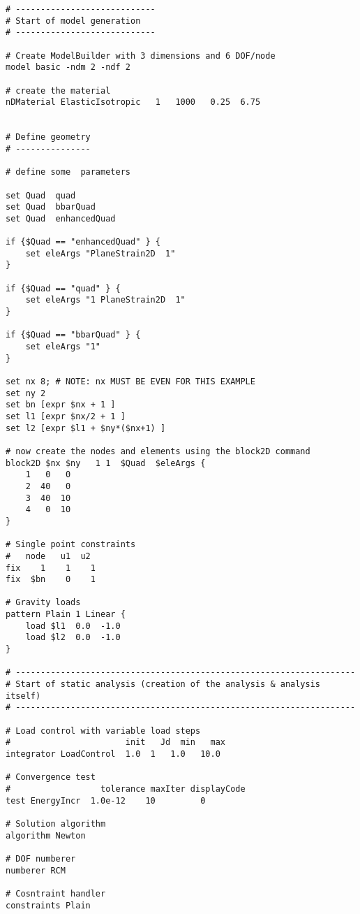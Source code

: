 \documentclass[12pt]{article}
\begin{document}
\vspace{0.2in} 
{\sf\small
\begin{verbatim}
# ----------------------------
# Start of model generation
# ----------------------------

# Create ModelBuilder with 3 dimensions and 6 DOF/node
model basic -ndm 2 -ndf 2

# create the material
nDMaterial ElasticIsotropic   1   1000   0.25  6.75 


# Define geometry
# ---------------

# define some  parameters

set Quad  quad
set Quad  bbarQuad
set Quad  enhancedQuad

if {$Quad == "enhancedQuad" } {
    set eleArgs "PlaneStrain2D  1"
} 

if {$Quad == "quad" } {
    set eleArgs "1 PlaneStrain2D  1"
} 

if {$Quad == "bbarQuad" } {
    set eleArgs "1"
}

set nx 8; # NOTE: nx MUST BE EVEN FOR THIS EXAMPLE
set ny 2
set bn [expr $nx + 1 ] 
set l1 [expr $nx/2 + 1 ] 
set l2 [expr $l1 + $ny*($nx+1) ]

# now create the nodes and elements using the block2D command
block2D $nx $ny   1 1  $Quad  $eleArgs {
    1   0   0
    2  40   0
    3  40  10
    4   0  10
}

# Single point constraints
#   node   u1  u2    
fix    1    1    1   
fix  $bn    0    1   

# Gravity loads
pattern Plain 1 Linear {
    load $l1  0.0  -1.0
    load $l2  0.0  -1.0
}

# --------------------------------------------------------------------
# Start of static analysis (creation of the analysis & analysis itself)
# --------------------------------------------------------------------

# Load control with variable load steps
#                       init   Jd  min   max
integrator LoadControl  1.0  1   1.0   10.0

# Convergence test
#                  tolerance maxIter displayCode
test EnergyIncr  1.0e-12    10         0

# Solution algorithm
algorithm Newton

# DOF numberer
numberer RCM

# Cosntraint handler
constraints Plain 


\end{verbatim}}
\end{document}
